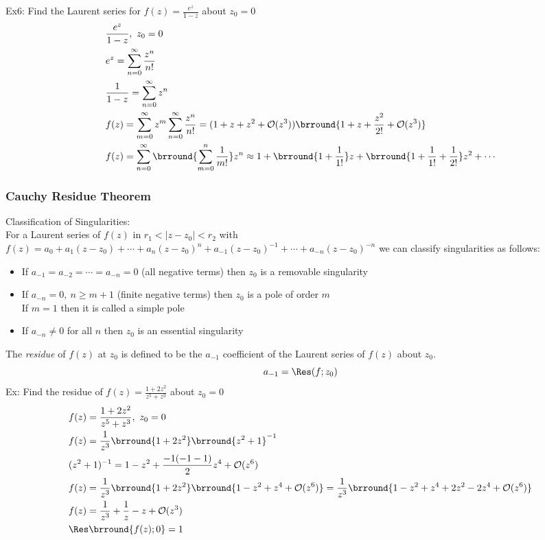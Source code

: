 Ex6: Find the Laurent series for $f(z)=\frac{e^z}{1-z}$ about $z_0=0$
\begin{align*}
    &\frac{e^z}{1-z},\ z_0=0\\
    &e^z=\sum_{n=0}^\infty\frac{z^n}{n!}\\
    &\frac{1}{1-z}=\sum_{n=0}^\infty z^n\\
    &f(z)=\sum_{m=0}^\infty z^m\sum_{n=0}^\infty\frac{z^n}{n!}=(1+z+z^2+\mathcal{O}(z^3))\brround{1+z+\frac{z^2}{2!}+\mathcal{O}(z^3)}\\
    &f(z)=\sum_{n=0}^\infty\brround{\sum_{m=0}^n\frac{1}{m!}}z^n\approx1+\brround{1+\frac{1}{1!}}z+\brround{1+\frac{1}{1!}+\frac{1}{2!}}z^2+\cdots
\end{align*}
\subsubsection{Cauchy Residue Theorem}
Classification of Singularities:\\
For a Laurent series of $f(z)$ in $r_1<|z-z_0|<r_2$ with $f(z)=a_0+a_1(z-z_0)+\cdots+a_n(z-z_0)^n+a_{-1}(z-z_0)^{-1}+\cdots+a_{-n}(z-z_0)^{-n}$ we can classify singularities as follows:
\begin{itemize}
    \item If $a_{-1}=a_{-2}=\cdots=a_{-n}=0$ (all negative terms) then $z_0$ is a removable singularity
    \item If $a_{-n}=0,\ n\geq m+1$ (finite negative terms) then $z_0$ is a pole of order $m$\\
    If $m=1$ then it is called a simple pole
    \item If $a_{-n}\neq0$ for all $n$ then $z_0$ is an essential singularity
\end{itemize}
The \textit{residue} of $f(z)$ at $z_0$ is defined to be the $a_{-1}$ coefficient of the Laurent series of $f(z)$ about $z_0$.
\[a_{-1}=\Res(f;z_0)\]
Ex: Find the residue of $f(z)=\frac{1+2z^2}{z^5+z^3}$ about $z_0=0$
\begin{align*}
    &f(z)=\frac{1+2z^2}{z^5+z^3},\ z_0=0\\
    &f(z)=\frac{1}{z^3}\brround{1+2z^2}\brround{z^2+1}^{-1}\\
    &(z^2+1)^{-1}=1-z^2+\frac{-1(-1-1)}{2}z^4+\bigO(z^6)\\
    &f(z)=\frac{1}{z^3}\brround{1+2z^2}\brround{1-z^2+z^4+\bigO(z^6)}=\frac{1}{z^3}\brround{1-z^2+z^4+2z^2-2z^4+\bigO(z^6)}\\
    &f(z)=\frac{1}{z^3}+\frac{1}{z}-z+\bigO(z^3)\\
    &\Res\brround{f(z);0}=1
\end{align*}

